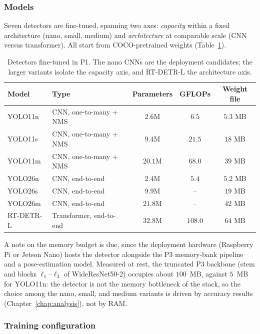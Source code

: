 \subsubsection{Models}

Seven detectors are fine-tuned, spanning two axes: \emph{capacity} within a
fixed architecture (nano, small, medium) and \emph{architecture} at comparable
scale (CNN versus transformer). All start from COCO-pretrained weights
(Table~\ref{tab:p1-models}).

\begin{table}[h]
  \centering
  \begin{tabular}{llccc}
    \hline
    Model & Type & Parameters & GFLOPs & Weight file \\
    \hline
    YOLO11n & CNN, one-to-many + NMS & $2.6$M & $6.5$ & $5.3$ MB \\
    YOLO11s & CNN, one-to-many + NMS & $9.4$M & $21.5$ & $18$ MB \\
    YOLO11m & CNN, one-to-many + NMS & $20.1$M & $68.0$ & $39$ MB \\
    YOLO26n & CNN, end-to-end & $2.4$M & $5.4$ & $5.2$ MB \\
    YOLO26s & CNN, end-to-end & $9.9$M & -- & $19$ MB \\
    YOLO26m & CNN, end-to-end & $21.8$M & -- & $42$ MB \\
    RT-DETR-L & Transformer, end-to-end & $32.8$M & $108.0$ & $64$ MB \\
    \hline
  \end{tabular}
  \caption{Detectors fine-tuned in P1. The nano CNNs are the deployment
  candidates; the larger variants isolate the capacity axis, and RT-DETR-L the
  architecture axis.}
  \label{tab:p1-models}
\end{table}

A note on the memory budget is due, since the deployment hardware (Raspberry
Pi or Jetson Nano) hosts the detector alongside the P3 memory-bank pipeline
and a pose-estimation model. Measured at rest, the truncated P3 backbone
(stem and blocks $\ell_1$--$\ell_3$ of WideResNet50-2) occupies about $100$~MB,
against $5$~MB for YOLO11n: the detector is not the memory bottleneck of the
stack, so the choice among the nano, small, and medium variants is driven by
accuracy results (Chapter~\ref{chap:analysis}), not by RAM.

\subsubsection{Training configuration}

